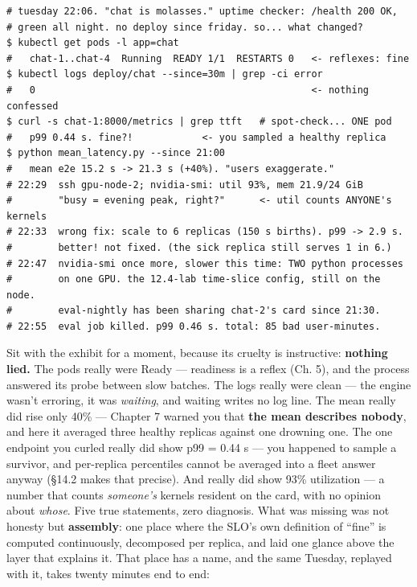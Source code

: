 \begin{terminalbox}
\begin{Verbatim}[breaklines=true,breakanywhere=true,fontsize=\small,formatcom=\color{tbbtermfg},codes=\tbbcodeactive]
# tuesday 22:06. "chat is molasses." uptime checker: /health 200 OK,
# green all night. no deploy since friday. so... what changed?
$ kubectl get pods -l app=chat
#   chat-1..chat-4  Running  READY 1/1  RESTARTS 0   <- reflexes: fine
$ kubectl logs deploy/chat --since=30m | grep -ci error
#   0                                                <- nothing confessed
$ curl -s chat-1:8000/metrics | grep ttft   # spot-check... ONE pod
#   p99 0.44 s. fine?!            <- you sampled a healthy replica
$ python mean_latency.py --since 21:00
#   mean e2e 15.2 s -> 21.3 s (+40%). "users exaggerate."
# 22:29  ssh gpu-node-2; nvidia-smi: util 93%, mem 21.9/24 GiB
#        "busy = evening peak, right?"      <- util counts ANYONE's kernels
# 22:33  wrong fix: scale to 6 replicas (150 s births). p99 -> 2.9 s.
#        better! not fixed. (the sick replica still serves 1 in 6.)
# 22:47  nvidia-smi once more, slower this time: TWO python processes
#        on one GPU. the 12.4-lab time-slice config, still on the node.
#        eval-nightly has been sharing chat-2's card since 21:30.
# 22:55  eval job killed. p99 0.46 s. total: 85 bad user-minutes.
\end{Verbatim}
\end{terminalbox}

Sit with the exhibit for a moment, because its cruelty is instructive: \textbf{nothing lied.} The pods really were Ready — readiness is a reflex (Ch. 5), and the process answered its probe between slow batches. The logs really were clean — the engine wasn’t erroring, it was \textit{waiting}, and waiting writes no log line. The mean really did rise only 40\% — Chapter 7 warned you that \textbf{the mean describes nobody}, and here it averaged three healthy replicas against one drowning one. The one  endpoint you curled really did show p99 = 0.44 s — you happened to sample a survivor, and per-replica percentiles cannot be averaged into a fleet answer anyway (§14.2 makes that precise). And  really did show 93\% utilization — a number that counts \textit{someone’s} kernels resident on the card, with no opinion about \textit{whose}. Five true statements, zero diagnosis. What was missing was not honesty but \textbf{assembly}: one place where the SLO’s own definition of “fine” is computed continuously, decomposed per replica, and laid one glance above the layer that explains it. That place has a name, and the same Tuesday, replayed with it, takes twenty minutes end to end:

